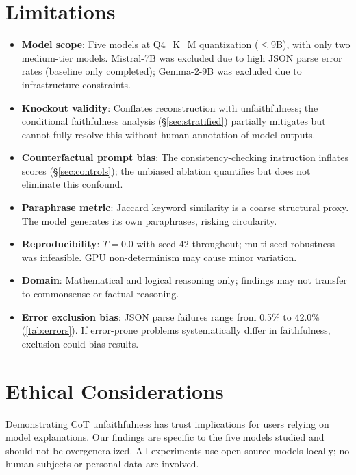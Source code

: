 \documentclass[11pt]{article}
\begin{document}
\section{Limitations}
\label{sec:limitations}

\begin{itemize}
    \item \textbf{Model scope}: Five models at Q4\_K\_M quantization ($\leq$9B), with only two medium-tier models. Mistral-7B was excluded due to high JSON parse error rates (baseline only completed); Gemma-2-9B was excluded due to infrastructure constraints.
    \item \textbf{Knockout validity}: Conflates reconstruction with unfaithfulness; the conditional faithfulness analysis (\S\ref{sec:stratified}) partially mitigates but cannot fully resolve this without human annotation of model outputs.
    \item \textbf{Counterfactual prompt bias}: The consistency-checking instruction inflates scores (\S\ref{sec:controls}); the unbiased ablation quantifies but does not eliminate this confound.
    \item \textbf{Paraphrase metric}: Jaccard keyword similarity is a coarse structural proxy. The model generates its own paraphrases, risking circularity.
    \item \textbf{Reproducibility}: $T{=}0.0$ with seed 42 throughout; multi-seed robustness was infeasible. GPU non-determinism may cause minor variation.
    \item \textbf{Domain}: Mathematical and logical reasoning only; findings may not transfer to commonsense or factual reasoning.
    \item \textbf{Error exclusion bias}: JSON parse failures range from 0.5\% to 42.0\% (\autoref{tab:errors}). If error-prone problems systematically differ in faithfulness, exclusion could bias results.
\end{itemize}

\section*{Ethical Considerations}

Demonstrating CoT unfaithfulness has trust implications for users relying on model explanations. Our findings are specific to the five models studied and should not be overgeneralized. All experiments use open-source models locally; no human subjects or personal data are involved.



\end{document}
